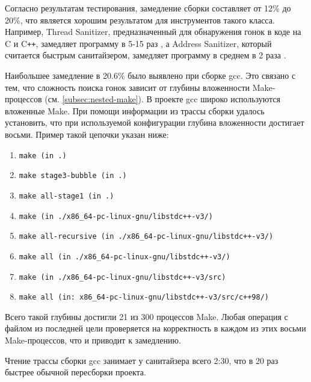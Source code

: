 Согласно результатам тестирования, замедление сборки составляет от 12\% до 20\%, что является хорошим результатом для инструментов такого класса. Например, Thread Sanitizer, предназначенный для обнаружения гонок в коде на C и C\texttt{++}, замедляет программу в 5-15 раз \cite{thread-sanitizer-docs}, а Address Sanitizer, который считается быстрым санитайзером, замедляет программу в среднем в 2 раза \cite{address-sanitizer-docs}.

Наибольшее замедление в 20.6\% было выявлено при сборке gcc. Это связано с тем, что сложность поиска гонок зависит от глубины вложенности Make-процессов (см. \ref{subsec:nested-make}). В проекте gcc широко используются вложенные Make. При помощи информации из трассы сборки удалось установить, что при используемой конфигурации глубина вложенности достигает восьми. Пример такой цепочки указан ниже:

\begin{enumerate}
    \item \texttt{make (in .)}
    \item \texttt{make stage3-bubble (in .)}
    \item \texttt{make all-stage1 (in .)}
    \item \texttt{make (in ./x86\_64-pc-linux-gnu/libstdc++-v3/)}
    \item \texttt{make all-recursive (in ./x86\_64-pc-linux-gnu/libstdc++-v3/)}
    \item \texttt{make all (in ./x86\_64-pc-linux-gnu/libstdc++-v3/)}
    \item \texttt{make (in ./x86\_64-pc-linux-gnu/libstdc++-v3/src)}
    \item \texttt{make all (in: x86\_64-pc-linux-gnu/libstdc++-v3/src/c++98/)}
\end{enumerate}

Всего такой глубины достигли 21 из 300 процессов Make. Любая операция с файлом из последней цели проверяется на корректность в каждом из этих восьми Make-процессов, что и приводит к замедлению.

Чтение трассы сборки gcc занимает у санитайзера всего 2:30, что в 20 раз быстрее обычной пересборки проекта.